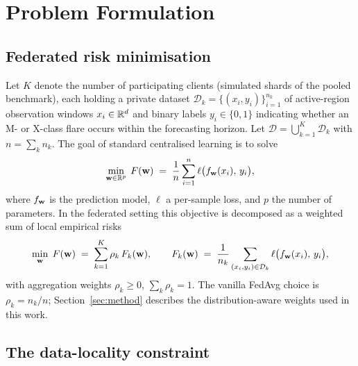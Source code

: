 \section{Problem Formulation}\label{sec:problem}

\subsection{Federated risk minimisation}

Let $K$ denote the number of participating clients (simulated shards
of the pooled benchmark), each
holding a private dataset
$\mathcal{D}_k = \{(x_i, y_i)\}_{i=1}^{n_k}$ of active-region
observation windows $x_i \in \mathbb{R}^{d}$ and binary labels
$y_i \in \{0,1\}$ indicating whether an M- or X-class flare occurs
within the forecasting horizon. Let
$\mathcal{D} = \bigcup_{k=1}^{K} \mathcal{D}_k$ with
$n = \sum_k n_k$. The goal of standard centralised learning is to
solve
\begin{equation}\label{eq:central}
    \min_{\mathbf{w} \in \mathbb{R}^{p}} \;
    F(\mathbf{w}) \;=\; \frac{1}{n}\sum_{i=1}^{n}
    \ell\big(f_{\mathbf{w}}(x_i),\, y_i\big),
\end{equation}
where $f_{\mathbf{w}}$ is the prediction model, $\ell$ a per-sample loss, and
$p$ the number of parameters. In the federated setting this objective
is decomposed as a weighted sum of local empirical risks
\begin{equation}\label{eq:fedobj}
    \min_{\mathbf{w}} \; F(\mathbf{w}) \;=\; \sum_{k=1}^{K} \rho_k \, F_k(\mathbf{w}),
    \qquad
    F_k(\mathbf{w}) \;=\; \frac{1}{n_k}\sum_{(x_i,y_i)\in\mathcal{D}_k}
    \ell\big(f_{\mathbf{w}}(x_i),\, y_i\big),
\end{equation}
with aggregation weights $\rho_k \ge 0$, $\sum_k \rho_k = 1$. The
vanilla FedAvg choice is $\rho_k = n_k / n$; Section~\ref{sec:method}
describes the distribution-aware weights used in this work.

\subsection{The data-locality constraint}

